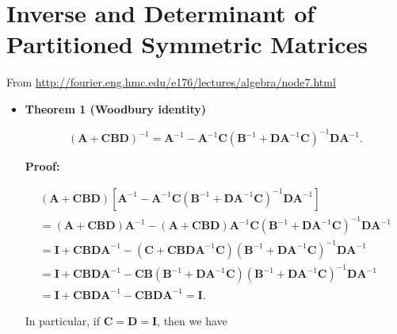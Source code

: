 \documentclass[10pt,b5paper,titlepage]{book}
\begin{document}
\chapter{Inverse and Determinant of Partitioned Symmetric Matrices}
From \url{http://fourier.eng.hmc.edu/e176/lectures/algebra/node7.html}\\

\begin{itemize}
    \item \textbf{Theorem 1 (Woodbury identity)}

        \begin{equation}
            (\mathbf{A} + \mathbf{C} \mathbf{B} \mathbf{D})^{-1} =
            \mathbf{A}^{-1} - \mathbf{A}^{-1} \mathbf{C} (\mathbf{B}^{-1} + \mathbf{D} \mathbf{A}^{-1} \mathbf{C})^{-1} \mathbf{D} \mathbf{A}^{-1}
        .\end{equation}

        \textbf{Proof:}

        \begin{equation}
            \begin{array}{l}
                (\mathbf{A} + \mathbf{C} \mathbf{B} \mathbf{D}) [\mathbf{A}^{-1} - \mathbf{A}^{-1} \mathbf{C} (\mathbf{B}^{-1} + \mathbf{D} \mathbf{A}^{-1} \mathbf{C})^{-1} \mathbf{D} \mathbf{A}^{-1}]\\
                = (\mathbf{A} + \mathbf{C} \mathbf{B} \mathbf{D}) \mathbf{A}^{-1} - (\mathbf{A} + \mathbf{C} \mathbf{B} \mathbf{D}) \mathbf{A}^{-1} \mathbf{C} ( \mathbf{B}^{-1} + \mathbf{D} \mathbf{A}^{-1} \mathbf{C})^{-1} \mathbf{D} \mathbf{A}^{-1}\\
                = \mathbf{I} + \mathbf{C} \mathbf{B} \mathbf{D} \mathbf{A}^{-1} - (\mathbf{C} + \mathbf{C} \mathbf{B} \mathbf{D} \mathbf{A}^{-1} \mathbf{C}) (\mathbf{B}^{-1} + \mathbf{D} \mathbf{A}^{-1} \mathbf{C})^{-1} \mathbf{D} \mathbf{A}^{-1}\\
                = \mathbf{I} + \mathbf{C} \mathbf{B} \mathbf{D} \mathbf{A}^{-1} - \mathbf{C} \mathbf{B} (\mathbf{B}^{-1} + \mathbf{D} \mathbf{A}^{-1} \mathbf{C}) (\mathbf{B}^{-1} + \mathbf{D} \mathbf{A}^{-1} \mathbf{C})^{-1} \mathbf{D} \mathbf{A}^{-1}\\
                = \mathbf{I} + \mathbf{C} \mathbf{B} \mathbf{D} \mathbf{A}^{-1} - \mathbf{C} \mathbf{B} \mathbf{D} \mathbf{A}^{-1} = \mathbf{I}.
            \end{array}
        \end{equation}

        In particular, if $\mathbf{C} = \mathbf{D} = \mathbf{I}$, then we have


\end{itemize}
\end{document}
